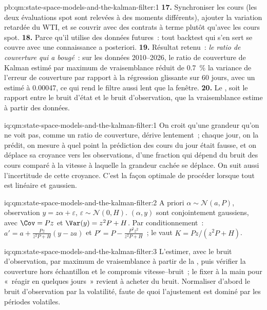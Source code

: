 \begin{solution}{pb:qm:state-space-models-and-the-kalman-filter:1}
\textbf{17.} Synchroniser les cours (les deux évaluations spot sont relevées à des moments différents), ajouter la variation retardée du WTI, et se couvrir avec des contrats à terme plutôt
qu'avec les cours spot.
\textbf{18.} Parce qu'il utilise des données futures~: tout backtest qui s'en sert se couvre avec une connaissance a posteriori.
\textbf{19.} Résultat retenu~: \emph{le ratio de couverture qui a bougé}~: sur les données 2010--2026, le ratio de couverture de Kalman estimé par maximum de vraisemblance réduit de
0.7~\% la variance de l'erreur de couverture par rapport à la régression glissante sur 60 jours, avec un  estimé à 0.00047, ce qui rend le filtre aussi lent que la fenêtre.
\textbf{20.} Le , soit le rapport entre le bruit d'état et le bruit d'observation, que la vraisemblance estime à partir des données.
\end{solution}

\begin{solution}{iq:qm:state-space-models-and-the-kalman-filter:1}
On croit qu'une grandeur qu'on ne voit pas, comme un ratio de couverture, dérive lentement~; chaque jour, on la prédit, on mesure à quel point la prédiction des cours du jour était fausse, et on déplace sa croyance
vers les observations, d'une fraction qui dépend du bruit des cours comparé à la vitesse à laquelle la grandeur cachée se déplace. On suit aussi l'incertitude de cette croyance.
C'est la façon optimale de procéder lorsque tout est linéaire et gaussien.
\end{solution}

\begin{solution}{iq:qm:state-space-models-and-the-kalman-filter:2}
A priori $\alpha \sim \mathcal N(a, P)$, observation $y = z\alpha + \varepsilon$, $\varepsilon \sim \mathcal N(0, H)$. $(\alpha, y)$ sont conjointement gaussiens, avec $\Cov = Pz$ et $\Var(y) = z^2P + H$.
Par conditionnement~: $a' = a + \frac{Pz}{z^2P + H}(y - za)$ et $P' = P - \frac{P^2z^2}{z^2P + H}$~; le  vaut $K = Pz/(z^2P + H)$.
\end{solution}

\begin{solution}{iq:qm:state-space-models-and-the-kalman-filter:3}
L'estimer, avec le bruit d'observation, par maximum de vraisemblance à partir de la , puis vérifier la couverture hors échantillon et le compromis vitesse--bruit~;
le fixer à la main pour «~réagir en quelques jours~» revient à acheter du bruit. Normaliser d'abord le bruit d'observation par la volatilité, faute de quoi l'ajustement est dominé par les périodes volatiles.
\end{solution}

